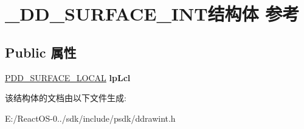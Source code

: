 \hypertarget{struct___d_d___s_u_r_f_a_c_e___i_n_t}{}\section{\+\_\+\+D\+D\+\_\+\+S\+U\+R\+F\+A\+C\+E\+\_\+\+I\+N\+T结构体 参考}
\label{struct___d_d___s_u_r_f_a_c_e___i_n_t}
\subsection*{Public 属性}
\begin{DoxyCompactItemize}
\item 
\mbox{\label{struct___d_d___s_u_r_f_a_c_e___i_n_t_abf31754dadfb2fb8faceacb993592d03}} 
\hyperlink{struct___d_d___s_u_r_f_a_c_e___l_o_c_a_l}{P\+D\+D\+\_\+\+S\+U\+R\+F\+A\+C\+E\+\_\+\+L\+O\+C\+AL} {\bfseries lp\+Lcl}
\end{DoxyCompactItemize}


该结构体的文档由以下文件生成\+:\begin{DoxyCompactItemize}
\item 
E\+:/\+React\+O\+S-\/0../sdk/include/psdk/ddrawint.\+h\end{DoxyCompactItemize}
